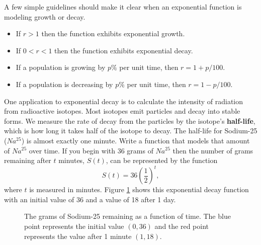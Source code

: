 \begin{callout}
    A few simple guidelines should make it clear when an exponential function is modeling
growth or decay.  
\begin{itemize}
    \item If $r > 1$ then the function exhibits exponential growth.
    \item If $0 < r < 1$ then the function exhibits exponential decay.
    \item If a population is growing by $p\%$ per unit time, then $r = 1+p/100$.
    \item If a population is decreasing by $p\%$ per unit time, then $r = 1-p/100$.
\end{itemize}
\end{callout}




\bex
One application to exponential decay is to calculate the intensity of radiation from
radioactive isotopes.  Most isotopes emit particles and decay into stable forms.  We
measure the rate of decay from the particles by the isotope's {\bf half-life}, which is
how long it takes half of the isotope to decay.  The half-life for Sodium-25 ($Na^{25}$)
is almost exactly one minute.  Write a function that models that amount of $Na^{25}$ over
time.    
\eex
If you begin with 36 grams of $Na^{25}$ then the number of
grams remaining after $t$ minutes, $S(t)$, can be represented by the function
\[ S(t) = 36 \left( \frac{1}{2} \right)^{t}, \]
where $t$ is measured in minutes. Figure \ref{F:0.2.Ex1} shows this exponential decay
function with an initial value of 36 and a value of 18 after 1 day.
\begin{figure}[ht!]
    \begin{center}
    \end{center}
    \caption{The grams of Sodium-25 remaining as a function of time. The blue point
    represents the initial value $(0,36)$ and the red point represents the value after 1
minute $(1,18)$.}
    \label{F:0.2.Ex1}
\end{figure}
\afterex

